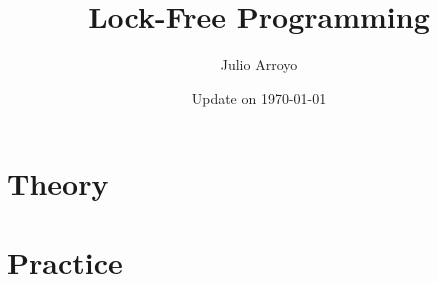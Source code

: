 \documentclass[11pt,twoside]{book}
\begin{document}
\title{\bf \huge Lock-Free Programming}
\author{Julio Arroyo}
\date{Update on \today}
\maketitle
\setcounter{tocdepth}{2}
\setcounter{minitocdepth}{1} 

\begin{multicols}{2}
    \dominitoc%
    \tableofcontents
    \label{toc-contents}
\end{multicols}

	\listoffigures
\begin{multicols}{2}
	\listoftheorems[ignoreall,show={theorem}]
\end{multicols}

	\renewcommand{\listtheoremname}{List of Definitions}
\begin{multicols}{2}
	\listoftheorems[ignoreall,show={definition}]
\end{multicols}





\part{Theory}



% 

% 

\part{Practice}

% 

\begin{appendices}

\end{appendices}

\backmatter


\printbibliography[heading=bibintoc]
\printindex
\end{document}
